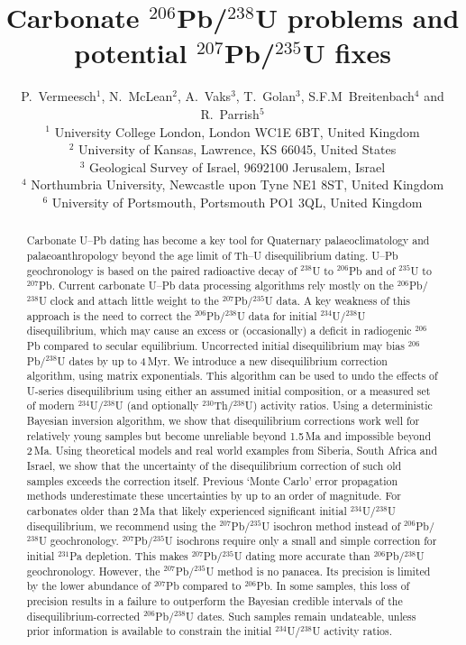 \documentclass{article}
\title{Carbonate ${}^{206}$Pb/${}^{238}$U problems and potential ${}^{207}$Pb/${}^{235}$U fixes}
\author{P.~Vermeesch$^1$, N.~McLean$^2$, A.~Vaks$^3$, T.~Golan$^3$, S.F.M~Breitenbach$^4$ and
  R.~Parrish$^5$\\
  $^1$ University College London, London WC1E 6BT, United Kingdom\\
  $^2$ University of Kansas, Lawrence, KS 66045, United States\\
  $^3$ Geological Survey of Israel, 9692100 Jerusalem, Israel\\
  $^4$ Northumbria University, Newcastle upon Tyne NE1 8ST, United Kingdom\\
  $^6$ University of Portsmouth, Portsmouth PO1 3QL, United Kingdom
}
\begin{document}
\maketitle

\begin{abstract}
  Carbonate U--Pb dating has become a key tool for Quaternary
  palaeoclimatology and palaeoanthropology beyond the age limit of
  Th--U disequilibrium dating. U--Pb geochronology is based on the
  paired radioactive decay of ${}^{238}$U to ${}^{206}$Pb and of
  ${}^{235}$U to ${}^{207}$Pb.  Current carbonate U--Pb data
  processing algorithms rely mostly on the ${}^{206}$Pb/${}^{238}$U
  clock and attach little weight to the ${}^{207}$Pb/${}^{235}$U
  data. A key weakness of this approach is the need to correct the
  ${}^{206}$Pb/${}^{238}$U data for initial ${}^{234}$U/${}^{238}$U
  disequilibrium, which may cause an excess or (occasionally) a
  deficit in radiogenic ${}^{206}$Pb compared to secular
  equilibrium. Uncorrected initial disequilibrium may bias
  ${}^{206}$Pb/${}^{238}$U dates by up to 4\,Myr. We introduce a new
  disequilibrium correction algorithm, using matrix exponentials. This
  algorithm can be used to undo the effects of U-series disequilibrium
  using either an assumed initial composition, or a measured set of
  modern ${}^{234}$U/${}^{238}$U (and optionally
  ${}^{230}$Th/${}^{238}$U) activity ratios. Using a deterministic
  Bayesian inversion algorithm, we show that disequilibrium
  corrections work well for relatively young samples but become
  unreliable beyond 1.5\,Ma and impossible beyond 2\,Ma.  Using
  theoretical models and real world examples from Siberia, South
  Africa and Israel, we show that the uncertainty of the
  disequilibrium correction of such old samples exceeds the correction
  itself. Previous `Monte Carlo' error propagation methods
  underestimate these uncertainties by up to an order of magnitude.
  For carbonates older than 2\,Ma that likely experienced significant
  initial ${}^{234}$U/${}^{238}$U disequilibrium, we recommend using
  the ${}^{207}$Pb/${}^{235}$U isochron method instead of
  ${}^{206}$Pb/${}^{238}$U geochronology.  ${}^{207}$Pb/${}^{235}$U
  isochrons require only a small and simple correction for initial
  ${}^{231}$Pa depletion. This makes ${}^{207}$Pb/${}^{235}$U dating
  more accurate than ${}^{206}$Pb/${}^{238}$U geochronology. However,
  the ${}^{207}$Pb/${}^{235}$U method is no panacea. Its precision is
  limited by the lower abundance of ${}^{207}$Pb compared to
  ${}^{206}$Pb. In some samples, this loss of precision results in a
  failure to outperform the Bayesian credible intervals of the
  disequilibrium-corrected ${}^{206}$Pb/${}^{238}$U dates. Such
  samples remain undateable, unless prior information is available to
  constrain the initial ${}^{234}$U/${}^{238}$U activity ratios.
\end{abstract}
\end{document}
